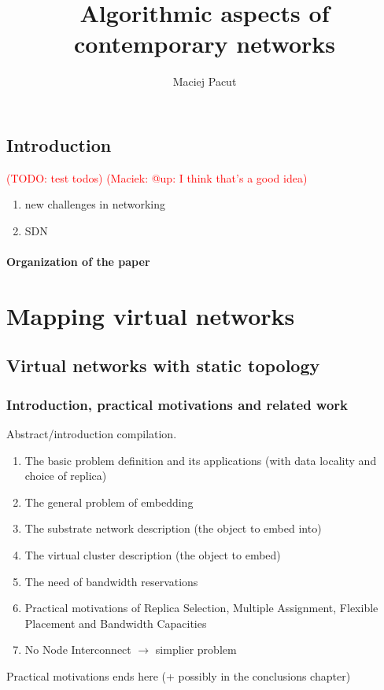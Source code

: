\documentclass[a4paper]{book}
\title{Algorithmic aspects of contemporary networks}
\author{Maciej Pacut}
\newcommand{\margcomm}[1]{\marginpar{\footnotesize\raggedright #1}}
\newcommand{\todo}[1]{\noindent\textcolor{red}{(TODO: #1)}\margcomm{TODO}}
\newcommand{\maciek}[1]{\textcolor{red}{(Maciek: #1)}\margcomm{maciek}}
\begin{document}
\maketitle

\tableofcontents


\chapter{Introduction}
\todo{test todos}
\maciek{@up: I think that's a good idea}

\begin{enumerate}
  \item new challenges in networking \cite{knapsack-cygan-jez}
  \item SDN
\end{enumerate}

\subsection{Organization of the paper}

\part{Mapping virtual networks}

\chapter{Virtual networks with static topology}

\section{Introduction, practical motivations and related work}
Abstract/introduction compilation.
\begin{enumerate}
  \item The basic problem definition and its applications (with data locality and choice of replica)
  \item The general problem of embedding
  \item The substrate network description (the object to embed into)
  \item The virtual cluster description (the object to embed)
  \item The need of bandwidth reservations
  \item Practical motivations of Replica Selection, Multiple Assignment, Flexible Placement and Bandwidth Capacities
  \item No Node Interconnect $\rightarrow$ simplier problem
\end{enumerate}
Practical motivations ends here (+ possibly in the conclusions chapter)
\end{document}
